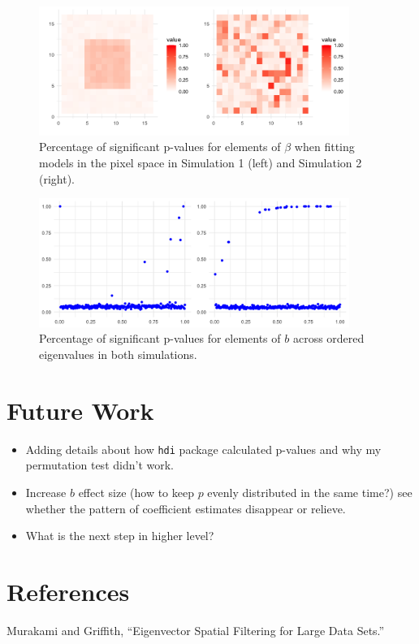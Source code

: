 \documentclass[12pt]{article}
\begin{document}
\begin{figure}[h!]
	\centering
	\includegraphics[width=0.9\textwidth]{perc_sign_pvals_hdi_beta.png}
	\caption{Percentage of significant p-values for elements of \( \beta \) when fitting models in the pixel space in
		Simulation 1 (left) and Simulation 2 (right).}
	\label{fig:perc_sign_beta}
\end{figure}

\begin{figure}[h!]
	\centering
	\includegraphics[width=0.9\textwidth]{perc_sign_pvals_hdi_b.png}
	\caption{Percentage of significant p-values for elements of \( b \) across ordered eigenvalues in both simulations.}
	\label{fig:perc_sign_b}
\end{figure}

\FloatBarrier


\section*{Future Work}

\begin{itemize}
  \item Adding details about how \texttt{hdi} package calculated p-values and why my permutation test didn't work.
  \item Increase \( b \) effect size (how to keep \( p \) evenly distributed in the same time?) see whether the pattern of coefficient estimates disappear or relieve.
  \item What is the next step in higher level?
\end{itemize}

\section*{References}

Murakami and Griffith, ``Eigenvector Spatial Filtering for Large Data Sets.''
\end{document}
